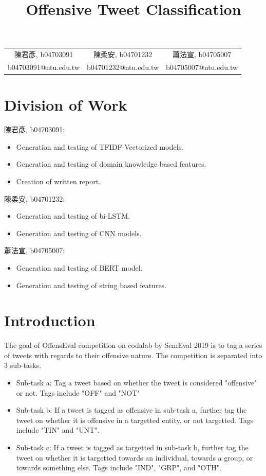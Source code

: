 \documentclass[a4paper, 12pt]{article}
\author{}
\title{\textbf{Offensive Tweet Classification}}
\begin{document}
    \maketitle     
    \begin{center}
        \begin{tabular}{ccc}
            陳君彥, b04703091 & 陳柔安, b04701232 & 蕭法宣, b04705007 \\
            b04703091@ntu.edu.tw &
            b04701232@ntu.edu.tw &
            b04705007@ntu.edu.tw
        \end{tabular}
    \end{center}

    \section*{Division of Work}
        陳君彥, b04703091: 
        \begin{itemize}
            \item Generation and testing of TFIDF-Vectorized models.
            \item Generation and testing of domain knowledge based features.
            \item Creation of written report.
        \end{itemize}
        陳柔安, b04701232:
        \begin{itemize}
            \item Generation and testing of bi-LSTM.
            \item Generation and testing of CNN models.
        \end{itemize}
        蕭法宣, b04705007:
        \begin{itemize}
            \item Generation and testing of BERT model.
            \item Generation and testing of string based features.
        \end{itemize}

    \section{Introduction}
        The goal of OffensEval competition on codalab by SemEval 2019 \cite{offens} is to tag a series of tweets with regards to their offensive nature. The competition is separated into 3 sub-tasks.
        \begin{itemize}
            \item Sub-task a: Tag a tweet based on whether the tweet is considered "offensive" or not. Tags include "OFF" and "NOT"
            \item Sub-task b: If a tweet is tagged as offensive in sub-task a, further tag the tweet on whether it is offensive in a targetted entity, or not targetted. Tags include "TIN" and "UNT".
            \item Sub-task c: If a tweet is tagged as targetted in sub-task b, further tag the tweet on whether it is targetted towards an individual, towards a group, or towards something else. Tags include "IND", "GRP", and "OTH".
        \end{itemize}
\end{document}

